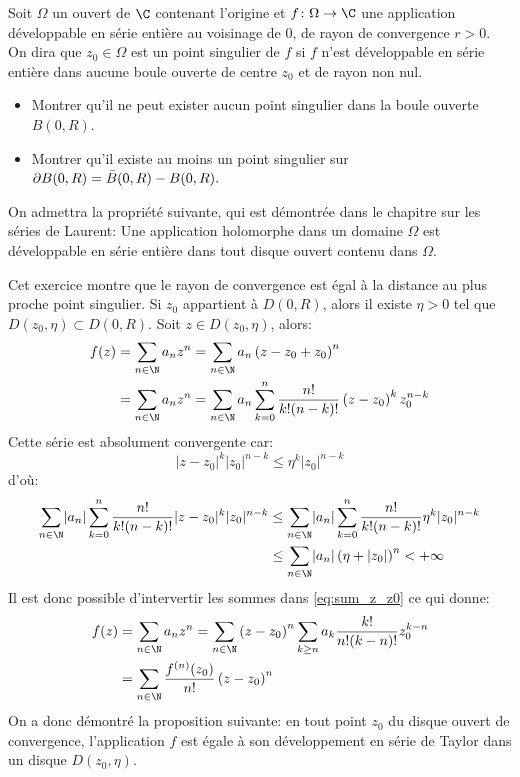 \documentclass[a4paper, 12pt]{amsart}
\begin{document}

\begin{fex}
    Soit $\Omega$ un ouvert de $\C$ contenant l'origine et $f \colon \Omega \to \C$ une application développable en
    série entière au voisinage de $0$, de rayon de convergence $r > 0$. On dira que $z_0 \in \Omega$ est un point singulier de $f$ si $f$ n'est développable en série entière dans aucune boule ouverte de centre $z_0$ et de rayon non nul.
    \begin{itemize}
        \item Montrer qu'il ne peut exister aucun point singulier dans la boule ouverte $B(0,R).$
        \item Montrer qu'il existe au moins un point singulier sur $\partial B(0,R) = \Bar{B}(0,R)-B(0,R).$
    \end{itemize}
    On admettra la propriété suivante, qui est démontrée dans le chapitre sur les séries de Laurent: Une application holomorphe dans un domaine $\Omega$ est développable en série entière dans tout disque ouvert contenu dans $\Omega.$
\end{fex}
Cet exercice montre que le rayon de convergence est égal à la distance au plus proche point singulier. 
Si $z_0$ appartient à $D(0,R)$, alors il existe $\eta > 0$ tel que $D(z_0,\eta) \subset D(0,R).$ Soit $z \in D(z_0,\eta)$, alors:
\begin{equation}
\label{eq:sum_z_z0}
\begin{split}
f(z) & = \sum_{n\in \N} a_n z^n = \sum_{n \in \N} a_n \left(
z-z_0 + z_0
\right)^n \\
& = \sum_{n\in \N} a_n z^n = \sum_{n \in \N} a_n \sum_{k=0}^n
\frac{n!}{k!(n-k)!} \left( z-z_0 \right)^k z_0^{n-k}
\end{split}
\end{equation}
Cette série est absolument convergente car:
\[
\lvert z-z_0 \rvert ^k \lvert z_0 \rvert^{n-k} \leq \eta^k \lvert z_0 \rvert^{n-k}
\]
d'où:
\[
\begin{split}
\sum_{n \in \N} \lvert  a_n \rvert \sum_{k=0}^n
\frac{n!}{k!(n-k)!} \lvert z-z_0 \rvert^k \lvert z_0\rvert ^{n-k} 
& \leq \sum_{n \in \N} \lvert  a_n \rvert \sum_{k=0}^n
\frac{n!}{k!(n-k)!} \eta^k \lvert z_0 \rvert^{n-k}\\
& \leq \sum_{n \in \N} \lvert  a_n \rvert \left( \eta + \lvert z_0 \rvert \right)^n < +\infty
\end{split}
\]
Il est donc possible d'intervertir les sommes dans \ref{eq:sum_z_z0} ce qui donne:
\begin{equation}
\begin{split}
 f(z) & = \sum_{n\in \N} a_n z^n = \sum_{n \in \N} \left(z-z_0\right)^n \sum_{k \geq n} a_k \frac{k!}{n! (k-n)!}z_0^{k-n} \\ 
  & = \sum_{n \in \N} \frac{f^{(n)}(z_0)}{n!} \left(z-z_0\right)^n
  \end{split}
\end{equation}
On a donc démontré la proposition suivante: en tout point $z_0$ du disque ouvert de convergence, l'application $f$ est égale à son développement en série de Taylor dans un disque $D(z_0,\eta).$
\end{document}
